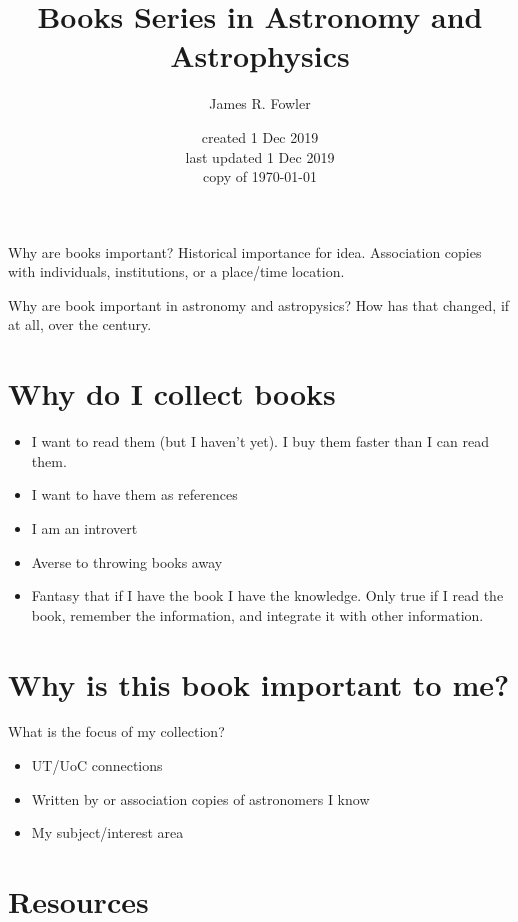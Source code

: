 \documentclass[letterpaper]{article}
\begin{document}
\title{Books Series in Astronomy and Astrophysics}
\author{James R. Fowler}
\date{created 1 Dec 2019\\ last updated 1 Dec 2019\\ copy of \today}

\maketitle

Why are books important? Historical importance for idea. Association
copies with individuals, institutions, or a place/time location.

Why are book important in  astronomy and astropysics? How
has that changed, if at all, over the century.

\section{Why do I collect books}

\begin{itemize}
\item I want to read them (but I haven't yet). I buy them faster than
  I can read them.
\item I want to have them as references
\item I am an introvert
\item Averse to throwing books away
\item Fantasy that if I have the book I have the knowledge. Only true
  if I read the book, remember the information, and integrate it with
  other information.
\end{itemize}

\section{Why is this book important to me?}

What is the focus of my collection?

\begin{itemize}
\item UT/UoC connections
\item Written by or association copies of astronomers I know
\item My subject/interest area
\end{itemize}

\section{Resources}
\end{document}

